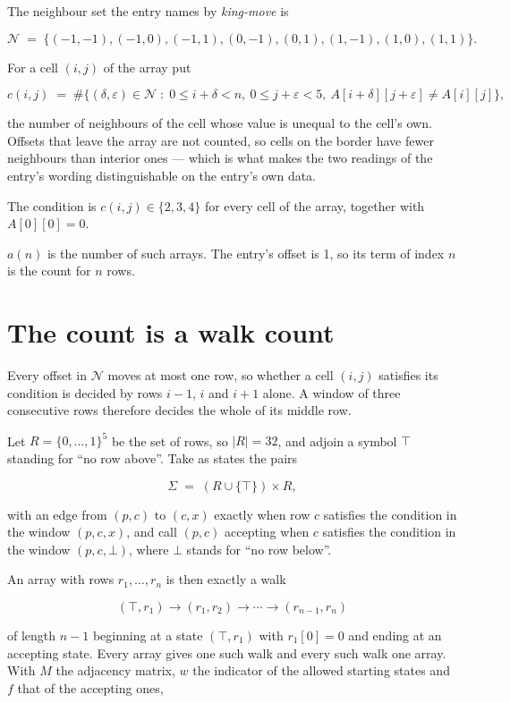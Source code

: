 \documentclass[11pt]{article}
\theoremstyle{definition}
\begin{document}
The neighbour set the entry names by {\itshape king-move} is

\[\mathcal{N} \;=\; \{(-1,-1), (-1,0), (-1,1), (0,-1), (0,1), (1,-1), (1,0), (1,1)\}.\]

For a cell $(i,j)$ of the array put

\[c(i,j) \;=\; \#\bigl\{(\delta,\varepsilon)\in\mathcal{N} \;:\; 0\le i+\delta<n,\ 0\le j+\varepsilon<5,\ A[i+\delta][j+\varepsilon] \neq A[i][j]\bigr\},\]

the number of neighbours of the cell whose value is unequal to the cell's own. Offsets that leave the array are not counted, so cells on the border have fewer neighbours than interior ones --- which is what makes the two readings of the entry's wording distinguishable on the entry's own data.

The condition is $c(i,j) \in \{2, 3, 4\}$ for every cell of the array, together with $A[0][0]=0$.

$a(n)$ is the number of such arrays. The entry's offset is 1, so its term of index $n$ is the count for $n$ rows.

\section{The count is a walk count}

Every offset in $\mathcal{N}$ moves at most one row, so whether a cell $(i,j)$ satisfies its condition is decided by rows $i-1$, $i$ and $i+1$ alone. A window of three consecutive rows therefore decides the whole of its middle row.

Let $R = \{0,\dots,1\}^{5}$ be the set of rows, so $|R| = 32$, and adjoin a symbol $\top$ standing for ``no row above''. Take as states the pairs

\[\Sigma \;=\; (R \cup \{\top\}) \times R,\]

with an edge from $(p,c)$ to $(c,x)$ exactly when row $c$ satisfies the condition in the window $(p,c,x)$, and call $(p,c)$ accepting when $c$ satisfies the condition in the window $(p,c,\bot)$, where $\bot$ stands for ``no row below''.

An array with rows $r_1,\dots,r_n$ is then exactly a walk

\[(\top,r_1) \to (r_1,r_2) \to \cdots \to (r_{n-1},r_n)\]

of length $n-1$ beginning at a state $(\top,r_1)$ with $r_1[0]=0$ and ending at an accepting state. Every array gives one such walk and every such walk one array. With $M$ the adjacency matrix, $w$ the indicator of the allowed starting states and $f$ that of the accepting ones,
\end{document}
